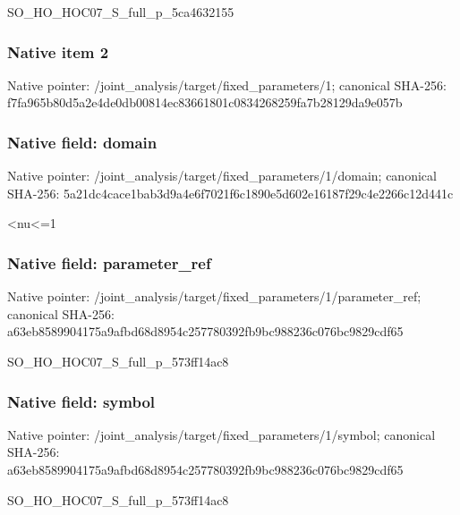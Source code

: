 \documentclass[10pt,a4paper]{article}
\begin{document}
\begingroup\raggedright\sloppy SO\_\allowbreak{}HO\_\allowbreak{}HOC07\_\allowbreak{}S\_\allowbreak{}full\_\allowbreak{}p\_\allowbreak{}5ca4632155\par\endgroup

\subsubsection{Native item 2}
Native pointer: /joint\_\allowbreak{}analysis/target/fixed\_\allowbreak{}parameters/1; canonical SHA-256: f7fa965b80d5a2e4de0db00814ec83661801c0834268259fa7b28129da9e057b

\subsubsection{Native field: domain}
Native pointer: /joint\_\allowbreak{}analysis/target/fixed\_\allowbreak{}parameters/1/domain; canonical SHA-256: 5a21dc4cace1bab3d9a4e6f7021f6c1890e5d602e16187f29c4e2266c12d441c

\begingroup\raggedright{}<nu<=\allowbreak{}1\par\endgroup

\subsubsection{Native field: parameter\_\allowbreak{}ref}
Native pointer: /joint\_\allowbreak{}analysis/target/fixed\_\allowbreak{}parameters/1/parameter\_\allowbreak{}ref; canonical SHA-256: a63eb8589904175a9afbd68d8954c257780392fb9bc988236c076bc9829cdf65

\begingroup\raggedright\sloppy SO\_\allowbreak{}HO\_\allowbreak{}HOC07\_\allowbreak{}S\_\allowbreak{}full\_\allowbreak{}p\_\allowbreak{}573ff14ac8\par\endgroup

\subsubsection{Native field: symbol}
Native pointer: /joint\_\allowbreak{}analysis/target/fixed\_\allowbreak{}parameters/1/symbol; canonical SHA-256: a63eb8589904175a9afbd68d8954c257780392fb9bc988236c076bc9829cdf65

\begingroup\raggedright\sloppy SO\_\allowbreak{}HO\_\allowbreak{}HOC07\_\allowbreak{}S\_\allowbreak{}full\_\allowbreak{}p\_\allowbreak{}573ff14ac8\par\endgroup
\end{document}
